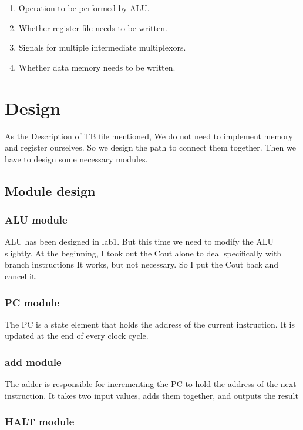 \documentclass[12pt,a4paper]{article}
\begin{document}
\begin{enumerate}
\item Operation to be performed by ALU.
\item Whether register file needs to be written.
\item Signals for multiple intermediate multiplexors.
\item Whether data memory needs to be written. 
\end{enumerate}

\newpage

\section{Design}

As the Description of TB file mentioned, We do not need to implement memory and register ourselves.
So we design the path to connect them together.
Then we have to design some necessary modules.

\subsection{Module design}

\subsubsection{ALU module}

ALU has been designed in lab1.
But this time we need to modify the ALU slightly.
At the beginning, I took out the Cout alone to deal specifically with branch instructions
It works, but not necessary.
So I put the Cout back and cancel it.


\subsubsection{PC module}

The PC is a state element that holds the address of the current instruction. 
It is updated at the end of every clock cycle.

\subsubsection{add module}

The adder is responsible for incrementing the PC to hold the address of the next instruction.
It takes two input values, adds them together, and outputs the result

\subsubsection{HALT module}
\end{document}
